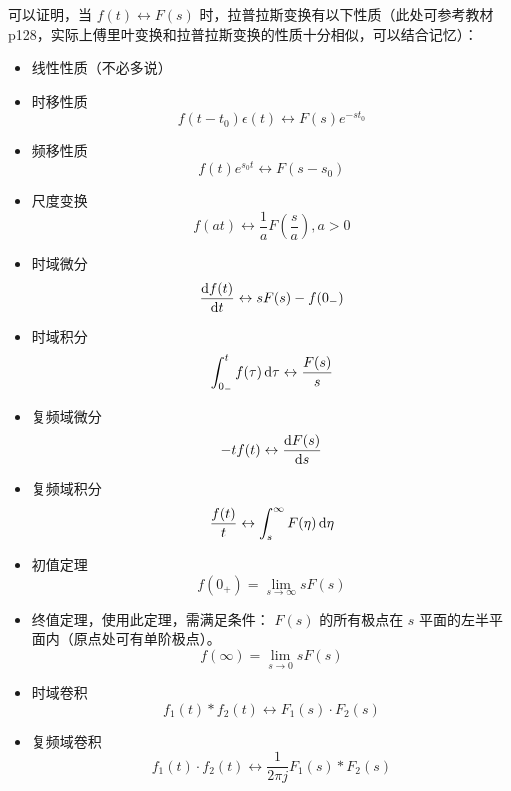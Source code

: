 \documentclass[UTF8,a4paper,11pt]{article}
\begin{document}
可以证明，当 $f(t)\leftrightarrow F(s)$ 时，拉普拉斯变换有以下性质（此处可参考教材p128，实际上傅里叶变换和拉普拉斯变换的性质十分相似，可以结合记忆）：
\begin{itemize}
\item 线性性质（不必多说）
\item 时移性质
\begin{equation}
f(t-t_0)\epsilon(t)\leftrightarrow F(s)e^{-st_0}
\end{equation}
\item 频移性质
\begin{equation}
f(t)e^{s_0 t}\leftrightarrow F(s-s_0)
\end{equation}
\item 尺度变换
\begin{equation}
f(at)\leftrightarrow \frac{1}{a}F(\frac{s}{a}), a>0
\end{equation}
\item 时域微分
\begin{equation}
\frac{{\rm d}f(t)}{{\rm d}t}\leftrightarrow sF(s)-f(0_-)
\end{equation}
\item 时域积分
\begin{equation}
\int_{0_-}^t {f(\tau)} \,{\rm d}\tau\leftrightarrow\frac{F(s)}{s}
\end{equation}
\item 复频域微分
\begin{equation}
-tf(t)\leftrightarrow \frac{{\rm d}F(s)}{{\rm d}s}
\end{equation}
\item 复频域积分
\begin{equation}
\frac{f(t)}{t}\leftrightarrow \int_s^{\infty} {F(\eta)} \,{\rm d}\eta
\end{equation}
\item 初值定理
\begin{equation}
f(0_+)=\lim_{s \to \infty}sF(s)
\end{equation}
\item 终值定理，使用此定理，需满足条件： $F(s)$ 的所有极点在 $s$ 平面的左半平面内（原点处可有单阶极点）。
\begin{equation}
f(\infty)=\lim_{s \to 0}sF(s)
\end{equation}
\item 时域卷积
\begin{equation}
f_1(t)*f_2(t)\leftrightarrow F_1(s)\cdot F_2(s)
\end{equation}
\item 复频域卷积
\begin{equation}
f_1(t)\cdot f_2(t)\leftrightarrow \frac{1}{2\pi j}F_1(s)*F_2(s)
\end{equation}
\end{itemize} 
\end{document}
